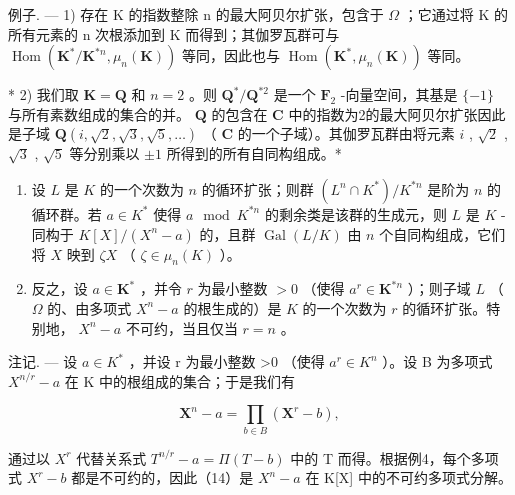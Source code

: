 例子. --- 1) 存在 K 的指数整除 n 的最大阿贝尔扩张，包含于 \(\Omega\) ；它通过将 K 的所有元素的 n 次根添加到 K 而得到；其伽罗瓦群可与 \(\operatorname{Hom}(\mathbf{K}^{*}/\mathbf{K}^{*n}, \mu_{n}(\mathbf{K}))\) 等同，因此也与 \(\operatorname{Hom}(\mathbf{K}^{*}, \mu_{n}(\mathbf{K}))\) 等同。

* 2) 我们取 \(\mathbf{K} = \mathbf{Q}\) 和 \(n = 2\) 。则 \(\mathbf{Q}^{*}/\mathbf{Q}^{*2}\) 是一个 \(\mathbf{F}_{2}\) -向量空间，其基是 \(\{-1\}\) 与所有素数组成的集合的并。 \(\mathbf{Q}\) 的包含在 \(\mathbf{C}\) 中的指数为2的最大阿贝尔扩张因此是子域 \(\mathbf{Q}(i, \sqrt{2}, \sqrt{3}, \sqrt{5}, \ldots)\) （ \(\mathbf{C}\) 的一个子域）。其伽罗瓦群由将元素 \(i\) , \(\sqrt{2}\) , \(\sqrt{3}\) , \(\sqrt{5}\) 等分别乘以 \(\pm 1\) 所得到的所有自同构组成。*

\begin{enumerate}
\def\labelenumi{\arabic{enumi})}
\setcounter{enumi}{2}
\item
  设 \(L\) 是 \(K\) 的一个次数为 \(n\) 的循环扩张；则群 \((L^n \cap K^*) / K^{*n}\) 是阶为 \(n\) 的循环群。若 \(a \in K^*\) 使得 \(a \mod K^{*n}\) 的剩余类是该群的生成元，则 \(L\) 是 \(K\) -同构于 \(K[X] / (X^n - a)\) 的，且群 \(\operatorname{Gal}(L / K)\) 由 \(n\) 个自同构组成，它们将 \(X\) 映到 \(\zeta X\) （ \(\zeta \in \mu_n(K)\) ）。
\item
  反之，设 \(a \in \mathbf{K}^*\) ，并令 \(r\) 为最小整数 \(> 0\) （使得 \(a^r \in \mathbf{K}^{*n}\) ）；则子域 \(L\) （ \(\Omega\) 的、由多项式 \(X^n - a\) 的根生成的）是 \(K\) 的一个次数为 \(r\) 的循环扩张。特别地， \(X^n - a\) 不可约，当且仅当 \(r = n\) 。
\end{enumerate}

注记. --- 设 \(a \in K^{*}\) ，并设 r 为最小整数 \textgreater0 （使得 \(a^{r} \in K^{n}\) ）。设 B 为多项式 \(X^{n/r} - a\) 在 K 中的根组成的集合；于是我们有

\[
\mathbf {X} ^ {n} - a = \prod_ {b \in B} \left(\mathbf {X} ^ {r} - b\right),\tag{14}
\]

通过以 \(X^{r}\) 代替关系式 \(T^{n/r}-a=\Pi(T-b)\) 中的 T 而得。根据例4，每个多项式 \(X^{r}-b\) 都是不可约的，因此（14）是 \(X^{n}-a\) 在 K{[}X{]} 中的不可约多项式分解。


